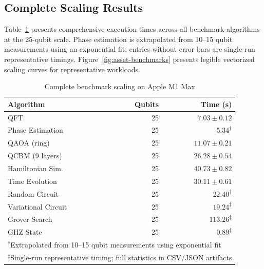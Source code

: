 \documentclass[runningheads]{llncs}
\begin{document}
\subsection{Complete Scaling Results}

Table~\ref{tab:scaling-full} presents comprehensive execution times across all benchmark algorithms at the 25-qubit scale. Phase estimation is extrapolated from 10--15 qubit measurements using an exponential fit; entries without error bars are single-run representative timings. Figure~\ref{fig:asset-benchmarks} presents legible vectorized scaling curves for representative workloads.

\begin{table}[t]
\caption{Complete benchmark scaling on Apple M1 Max}
\label{tab:scaling-full}
\centering
\begin{tabular}{lrr}
\toprule
Algorithm & Qubits & Time (s) \\
\midrule
QFT & 25 & $7.03 \pm 0.12$ \\
Phase Estimation & 25 & $5.34^\dagger$ \\
QAOA (ring) & 25 & $11.07 \pm 0.21$ \\
QCBM (9 layers) & 25 & $26.28 \pm 0.54$ \\
Hamiltonian Sim. & 25 & $40.73 \pm 0.82$ \\
Time Evolution & 25 & $30.11 \pm 0.61$ \\
Random Circuit & 25 & $22.40^\ddagger$ \\
Variational Circuit & 25 & $19.24^\ddagger$ \\
Grover Search & 25 & $113.26^\ddagger$ \\
GHZ State & 25 & $0.89^\ddagger$ \\
\bottomrule
\multicolumn{3}{l}{\footnotesize $^\dagger$Extrapolated from 10--15 qubit measurements using exponential fit} \\
\multicolumn{3}{l}{\footnotesize $^\ddagger$Single-run representative timing; full statistics in CSV/JSON artifacts}
\end{tabular}
\end{table}
\end{document}
